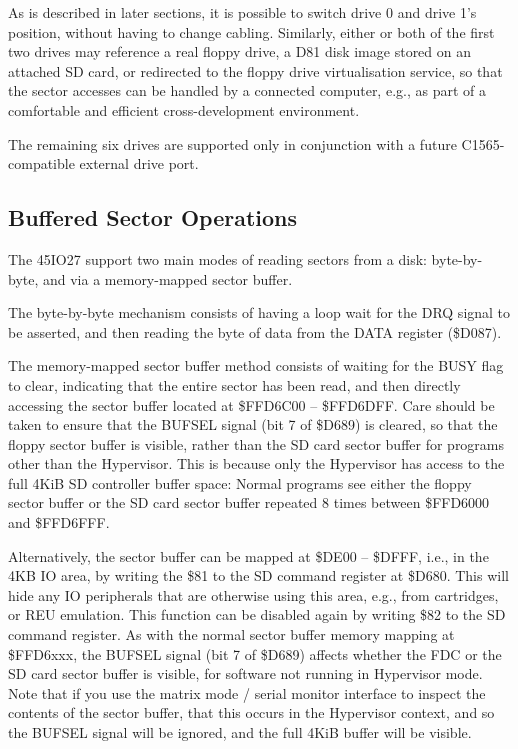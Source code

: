 As is described in later sections, it is possible to switch drive 0
and drive 1's position, without having to change cabling. Similarly,
either or both of the first two drives may reference a real floppy
drive, a D81 disk image stored on an attached SD card, or redirected
to the floppy drive virtualisation service, so that the sector
accesses can be handled by a connected computer, e.g., as part of a
comfortable and efficient cross-development environment.

The remaining six drives are supported only in conjunction with a
future C1565-compatible external drive port.

\subsection{Buffered Sector Operations}
\label{subsec:reading-from-disks-and-buffer-management}

The 45IO27 support two main modes of reading sectors from a
disk: byte-by-byte, and via a memory-mapped sector buffer.

The byte-by-byte mechanism consists of having a loop wait for the DRQ
signal to be asserted, and then reading the byte of data from the DATA
register (\$D087).

The memory-mapped sector buffer method consists of waiting for the
BUSY flag to clear, indicating that the entire sector has been read,
and then directly accessing the sector buffer located at \$FFD6C00 --
\$FFD6DFF. Care should be taken to ensure that the BUFSEL signal (bit 7 of \$D689) is
cleared, so that the floppy sector buffer is visible, rather than the
SD card sector buffer for programs other than the Hypervisor. This
is because only the Hypervisor has access to the full 4KiB SD
controller buffer space: Normal programs see either the floppy
sector buffer or the SD card sector buffer repeated 8 times between
\$FFD6000 and \$FFD6FFF.

Alternatively, the sector buffer can be mapped at \$DE00 -- \$DFFF,
i.e., in the 4KB IO area, by writing the \$81 to the SD command
register at \$D680.  This will hide any IO peripherals that are
otherwise using this area, e.g., from cartridges, or REU emulation.
This function can be disabled again by writing \$82 to the SD command
register. As with the normal sector buffer memory mapping at
\$FFD6xxx, the BUFSEL signal (bit 7 of \$D689) affects whether the FDC
or the SD card sector buffer is visible, for software not running in
Hypervisor mode.  Note that if you use the matrix mode / serial monitor
interface to inspect the contents of the sector buffer, that this occurs
in the Hypervisor context, and so the BUFSEL signal will be ignored,
and the full 4KiB buffer will be visible.

